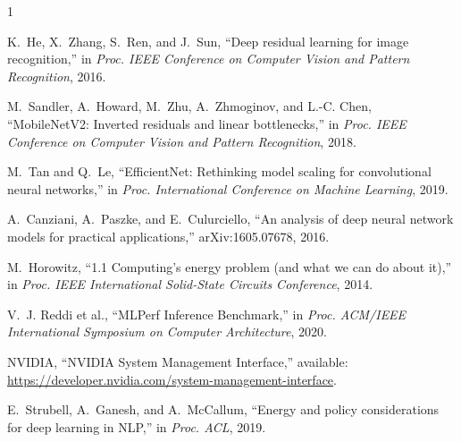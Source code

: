 \documentclass[conference]{IEEEtran}
\begin{document}
\begin{thebibliography}{1}

K.~He, X.~Zhang, S.~Ren, and J.~Sun, ``Deep residual learning for image
recognition,'' in \emph{Proc. IEEE Conference on Computer Vision and Pattern
Recognition}, 2016.

M.~Sandler, A.~Howard, M.~Zhu, A.~Zhmoginov, and L.-C. Chen,
``MobileNetV2: Inverted residuals and linear bottlenecks,'' in \emph{Proc.
IEEE Conference on Computer Vision and Pattern Recognition}, 2018.

M.~Tan and Q.~Le, ``EfficientNet: Rethinking model scaling for convolutional
neural networks,'' in \emph{Proc. International Conference on Machine
Learning}, 2019.

A.~Canziani, A.~Paszke, and E.~Culurciello, ``An analysis of deep neural
network models for practical applications,'' arXiv:1605.07678, 2016.

M.~Horowitz, ``1.1 Computing's energy problem (and what we can do about it),''
in \emph{Proc. IEEE International Solid-State Circuits Conference}, 2014.

V.~J. Reddi et al., ``MLPerf Inference Benchmark,'' in \emph{Proc. ACM/IEEE
International Symposium on Computer Architecture}, 2020.

NVIDIA, ``NVIDIA System Management Interface,'' available:
\url{https://developer.nvidia.com/system-management-interface}.

E.~Strubell, A.~Ganesh, and A.~McCallum, ``Energy and policy considerations
for deep learning in NLP,'' in \emph{Proc. ACL}, 2019.

\end{thebibliography}
\end{document}
